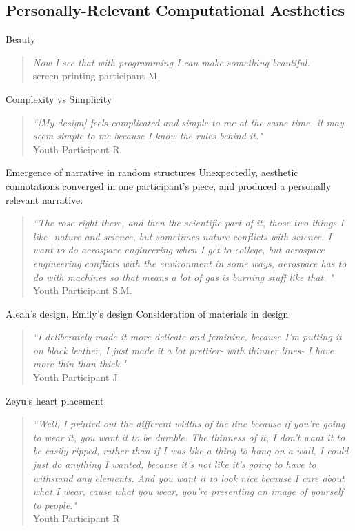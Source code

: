 \documentclass{sigchi}
\begin{document}
\subsection{Personally-Relevant Computational Aesthetics}
Beauty
\begin{quotation}
	\textit{Now I see that with programming I can make something beautiful.}
	\\screen printing participant M
\end{quotation}
Complexity vs Simplicity
\begin{quotation}
\textit{``[My design] feels complicated and simple to me at the same time- it may seem simple to me because I know the rules behind it."}
\\Youth Participant R.
\end{quotation}
Emergence of narrative in random structures
Unexpectedly, aesthetic connotations converged in one participant's piece, and produced a personally relevant narrative:
\begin{quotation}
\textit{``The rose right there, and then the scientific part of it, those two things I like- nature and science, but sometimes nature conflicts with science. I want to do aerospace engineering when I get to college, but aerospace engineering conflicts with the environment in some ways, aerospace has to do with machines so that means a lot of gas is burning stuff like that. "}
\\Youth Participant S.M.
\end{quotation}

Aleah's design, Emily's design
Consideration of materials in design
\begin{quotation}
\textit{``I deliberately made it more delicate and feminine, because I'm putting it on black leather, I just made it a lot prettier- with thinner lines- I have more thin than thick."}
\\Youth Participant J
\end{quotation}
Zeyu's heart placement
\begin{quotation}
\textit{``Well, I printed out the different widths of the line because if you're going to wear it, you want it to be durable. The thinness of it, I don't want it to be easily ripped, rather than if I was like a thing to hang on a wall, I could just do anything I wanted, because it's not like it's going to have to withstand any elements. And you want it to look nice because I care about what I wear, cause what you wear, you're presenting an image of yourself to people."}
\\Youth Participant R
\end{quotation}
\end{document}
